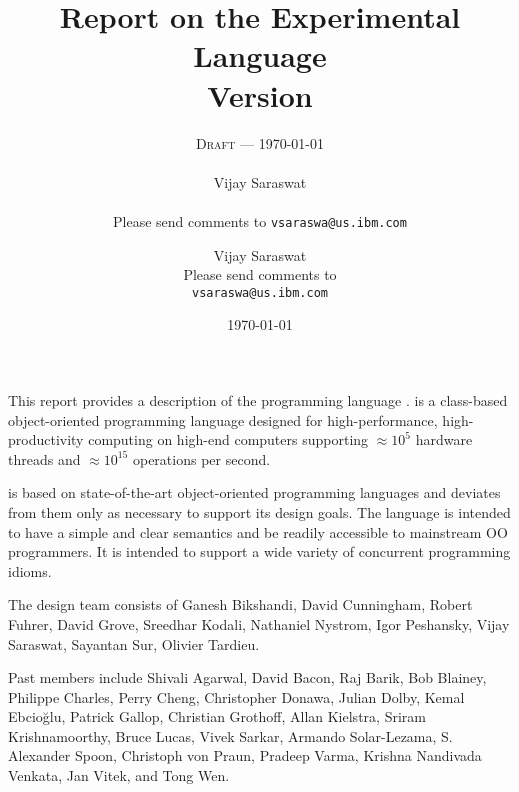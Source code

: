 
\thispagestyle{empty}


\title{Report on the Experimental Language \Xten \\
\large Version \integerversion}
\ifdraft
\author{\textsc{Draft} --- \today \\
\\
Vijay Saraswat \\
\\
Please send comments to 
\texttt{vsaraswa@us.ibm.com}}
\else
\author{
Vijay Saraswat \\
Please send comments to \\
\texttt{vsaraswa@us.ibm.com}}
\fi
\date{\today}

\maketitle

\newcommand\authorsc[1]{#1}

This report provides a description of the programming
language \Xten. \Xten{} is a class-based object-oriented
programming language designed for high-performance, high-productivity
computing on high-end computers supporting $\approx 10^5$ hardware threads
and $\approx 10^{15}$ operations per second. 

\Xten{} is based on state-of-the-art object-oriented programming
languages and deviates from them only as necessary to support its
design goals. The language is intended to have a simple and clear
semantics and be readily accessible to mainstream OO programmers. It
is intended to support a wide variety of concurrent programming
idioms.


The \Xten{} design team consists of
\authorsc{Ganesh Bikshandi}, 
\authorsc{David Cunningham},
\authorsc{Robert Fuhrer},
\authorsc{David Grove},
\authorsc{Sreedhar Kodali}, 
\authorsc{Nathaniel Nystrom},
\authorsc{Igor Peshansky}, 
\authorsc{Vijay Saraswat},
\authorsc{Sayantan Sur}, 
\authorsc{Olivier Tardieu}.


Past members include
\authorsc{Shivali Agarwal}, 
\authorsc{David Bacon}, 
\authorsc{Raj Barik}, 
\authorsc{Bob Blainey}, 
\authorsc{Philippe Charles}, 
\authorsc{Perry Cheng}, 
\authorsc{Christopher Donawa}, 
\authorsc{Julian Dolby}, 
\authorsc{Kemal Ebcio\u{g}lu},
\authorsc{Patrick Gallop}, 
\authorsc{Christian Grothoff}, 
\authorsc{Allan Kielstra}, 
\authorsc{Sriram Krishnamoorthy}, 
\authorsc{Bruce Lucas},
\authorsc{Vivek Sarkar},
\authorsc{Armando Solar-Lezama},  
\authorsc{S. Alexander Spoon}, 
\authorsc{Christoph von Praun},
\authorsc{Pradeep Varma}, 
\authorsc{Krishna Nandivada Venkata},
\authorsc{Jan Vitek}, and
\authorsc{Tong Wen}.


